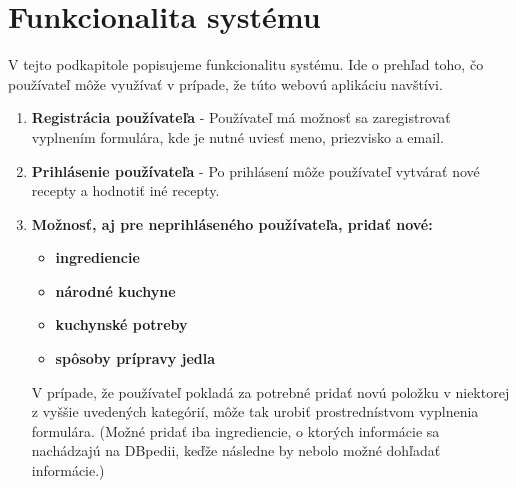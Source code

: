 \section{Funkcionalita systému}
V tejto podkapitole popisujeme funkcionalitu systému. Ide o prehľad toho, čo používateľ môže využívať v prípade, že túto webovú aplikáciu navštívi.
\begin{enumerate}
\item \textbf{Registrácia používateľa} - Používateľ má možnosť sa zaregistrovať vyplnením formulára, kde je nutné uviesť meno, priezvisko a email. 
\item \textbf{Prihlásenie používateľa} - Po prihlásení môže používateľ vytvárať nové recepty a hodnotiť iné recepty.
\item \textbf{Možnosť, aj pre neprihláseného používateľa, pridať nové:}

\begin{itemize}
\item \textbf{ingrediencie}
\item \textbf{národné kuchyne}
\item \textbf{kuchynské potreby}
\item \textbf{spôsoby prípravy jedla}
\end{itemize} 

V prípade, že používateľ pokladá za potrebné pridať novú položku v niektorej  z vyššie uvedených kategórií, môže tak urobiť prostrednístvom vyplnenia formulára. (Možné pridať iba ingrediencie, o ktorých informácie sa nachádzajú na DBpedii, keďže následne by nebolo možné dohľadať informácie.)


\end{enumerate}
